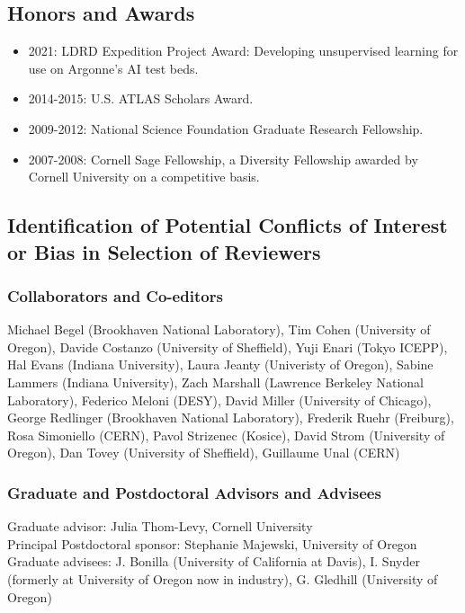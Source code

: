 \documentclass[letter, USenglish, 11pt, subfigure]{article}
\begin{document}
\subsection{Honors and Awards}
\begin{itemize}
\item 2021: LDRD Expedition Project Award: Developing unsupervised learning for use on Argonne's AI test beds.
\item 2014-2015: U.S. ATLAS Scholars Award.
\item 2009-2012: National Science Foundation Graduate Research Fellowship.
\item 2007-2008: Cornell Sage Fellowship, a Diversity Fellowship awarded by Cornell University on a competitive basis.
\end{itemize}

\clearpage
\subsection{Identification of Potential Conflicts of Interest or Bias in Selection of Reviewers}
\subsubsection{Collaborators and Co-editors}
Michael Begel (Brookhaven National Laboratory), Tim Cohen (University of Oregon), Davide Costanzo (University of Sheffield), Yuji Enari (Tokyo ICEPP), Hal Evans (Indiana University), Laura Jeanty (Univeristy of Oregon), Sabine Lammers (Indiana University), Zach Marshall (Lawrence Berkeley National Laboratory), Federico Meloni (DESY), David Miller (University of Chicago), George Redlinger (Brookhaven National Laboratory), Frederik Ruehr (Freiburg), Rosa Simoniello (CERN), Pavol Strizenec (Kosice), David Strom (University of Oregon), Dan Tovey (University of Sheffield), Guillaume Unal (CERN)

\subsubsection{Graduate and Postdoctoral Advisors and Advisees}
Graduate advisor: Julia Thom-Levy, Cornell University
\\Principal Postdoctoral sponsor: Stephanie Majewski, University of Oregon\\
Graduate advisees: J. Bonilla (University of California at Davis), I. Snyder (formerly at University of Oregon now in industry), G. Gledhill (University of Oregon)
\clearpage
\end{document}
